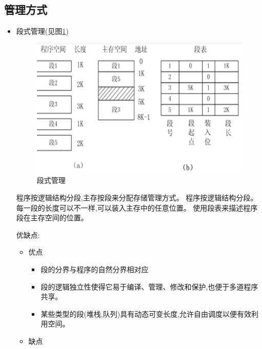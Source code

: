\documentclass[UTF8,a4paper]{ctexart}%
\begin{document}
      \subsection{管理方式}
          \begin{itemize}
            \item 段式管理(见图\ref{fig2})
                \begin{figure}[!htp]
                  \centering
                  \includegraphics[scale=0.3]{assets/jisuanjizucheng2_9e284.png}
                  \caption{段式管理}
                  \label{fig2}
                \end{figure}

                程序按逻辑结构分段,主存按段来分配存储管理方式。
                程序按逻辑结构分段。
                每一段的长度可以不一样,可以装入主存中的任意位置。
                使用段表来描述程序段在主存空间的位置。

                优缺点:
                \begin{itemize}
                  \item 优点

                      \begin{itemize}
                        \item 段的分界与程序的自然分界相对应
                        \item 段的逻辑独立性使得它易于编译、管理、修改和保护,也便于多道程序共享。
                        \item 某些类型的段(堆栈,队列)具有动态可变长度,允许自由调度以便有效利用空间。

                      \end{itemize}

                  \item 缺点


\end{itemize}
\end{itemize}
\end{document}
